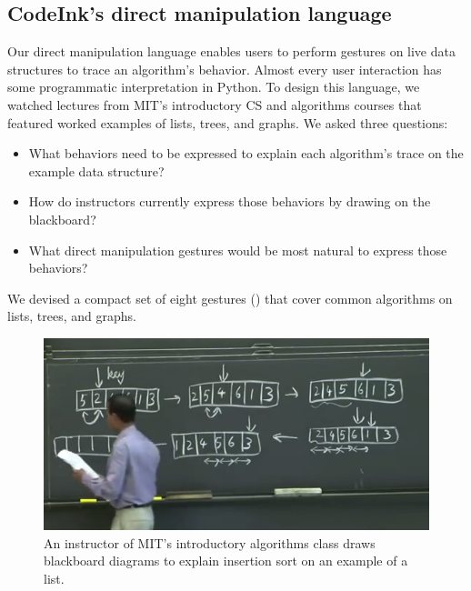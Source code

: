 \subsection{CodeInk's direct manipulation language}

Our direct manipulation language enables users to perform gestures on live data
structures to trace an algorithm's behavior. Almost every user interaction
has some programmatic interpretation in Python.
To design this language, we watched lectures from MIT's
introductory CS and algorithms courses that featured worked examples of
lists, trees, and graphs. We asked three questions:

\begin{itemize}

  \item What behaviors need to be expressed to explain each algorithm's
  trace on the example data structure?

  \item How do instructors currently express those behaviors by drawing
  on the blackboard?

  \item What direct manipulation gestures would be most natural to
  express those behaviors?

\end{itemize}

We devised a compact set of eight gestures ()
that cover common algorithms on lists, trees, and graphs.



\begin{figure}

\begin{center}
\includegraphics[width=0.7\columnwidth]{img/6006/insertion.png}
\end{center}

\caption{An instructor of MIT's introductory algorithms class draws
blackboard diagrams to explain insertion sort on an example of a list.}
\label{fig:6006-insertion}
\end{figure}


